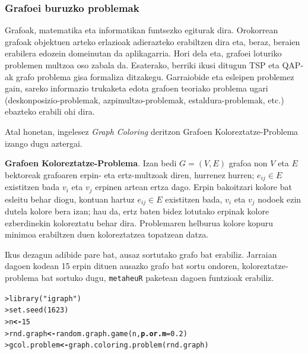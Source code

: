 \documentclass[eu]{ifirak}\usepackage[]{graphicx}\usepackage[]{color}
\makeatletter
\newcommand{\hlnum}[1]{\textcolor[rgb]{0.659,0.4,0.051}{#1}}%
\newcommand{\hlstr}[1]{\textcolor[rgb]{0.659,0.4,0.051}{#1}}%
\newcommand{\hlstd}[1]{\textcolor[rgb]{0,0,0}{#1}}%
\newcommand{\hlkwb}[1]{\textcolor[rgb]{0.549,0.114,0.412}{\textbf{#1}}}%
\newcommand{\hlkwc}[1]{\textcolor[rgb]{0.659,0.573,0.133}{\textbf{#1}}}%
\newcommand{\hlkwd}[1]{\textcolor[rgb]{0.659,0.133,0.482}{#1}}%
\newenvironment{kframe}{%
 \def\at@end@of@kframe{}%
 \ifinner\ifhmode%
  \def\at@end@of@kframe{\end{minipage}}%
  \begin{minipage}{\columnwidth}%
 \fi\fi%
 \def\FrameCommand##1{\hskip\@totalleftmargin \hskip-\fboxsep
 \colorbox{shadecolor}{##1}\hskip-\fboxsep
     \hskip-\linewidth \hskip-\@totalleftmargin \hskip\columnwidth}%
 \MakeFramed {\advance\hsize-\width
   \@totalleftmargin\z@ \linewidth\hsize
   \@setminipage}}%
 {\par\unskip\endMakeFramed%
 \at@end@of@kframe}
\newenvironment{knitrout}{}{} %
\newcommand{\code}[1]{\texttt{#1}}
\makeatother
\begin{document}
\subsubsection{Grafoei buruzko problemak}
Grafoak, matematika eta informatikan funtsezko egiturak dira. Orokorrean grafoak objektuen arteko erlazioak adierazteko erabiltzen dira eta, beraz, beraien erabilera edozein domeinutan da aplikagarria. Hori dela eta, grafoei loturiko problemen multzoa oso zabala da. Esaterako, berriki ikusi ditugun TSP eta QAP-ak grafo problema gisa formaliza ditzakegu. Garraiobide eta esleipen problemez gain, sareko informazio trukaketa edota grafoen teoriako problema ugari (deskonposizio-problemak, azpimultzo-problemak, estaldura-problemak, etc.) ebazteko erabili ohi dira.

Atal honetan, ingelesez \textit{Graph Coloring} deritzon Grafoen Koloreztatze-Problema izango dugu aztergai.

\begin{ifdefinition} {\bf Grafoen Koloreztatze-Problema}. Izan bedi $G=(V,E)$ grafoa non $V$ eta $E$ bektoreak grafoaren erpin- eta ertz-multzoak diren, hurrenez hurren; $e_{ij}\in E$ existitzen bada $v_i$ eta $v_j$ erpinen artean ertza dago. Erpin bakoitzari kolore bat esleitu behar diogu, kontuan hartuz $e_{ij}\in E$ existitzen bada, $v_i$ eta $v_j$ nodoek ezin dutela kolore bera izan; hau da, ertz baten bidez lotutako erpinak kolore ezberdinekin koloreztatu behar dira. Problemaren helburua kolore kopuru minimoa erabiltzen duen koloreztatzea topatzean datza.
\end{ifdefinition}

Ikus dezagun adibide pare bat, ausaz sortutako grafo bat erabiliz. Jarraian dagoen kodean 15 erpin dituen ausazko grafo bat sortu ondoren, koloreztatze-problema bat sortuko dugu, \code{metaheuR} paketean dagoen funtzioak erabiliz.

\begin{knitrout}
\color{fgcolor}\begin{kframe}
\begin{alltt}
\hlstd{> }\hlkwd{library}\hlstd{(}\hlstr{"igraph"}\hlstd{)}
\hlstd{> }\hlkwd{set.seed}\hlstd{(}\hlnum{1623}\hlstd{)}
\hlstd{> }\hlstd{n} \hlkwb{<-} \hlnum{15}
\hlstd{> }\hlstd{rnd.graph} \hlkwb{<-} \hlkwd{random.graph.game}\hlstd{(n ,} \hlkwc{p.or.m} \hlstd{=} \hlnum{0.2}\hlstd{)}
\hlstd{> }\hlstd{gcol.problem} \hlkwb{<-} \hlkwd{graph.coloring.problem} \hlstd{(rnd.graph)}
\end{alltt}
\end{kframe}
\end{knitrout}
\end{document}
